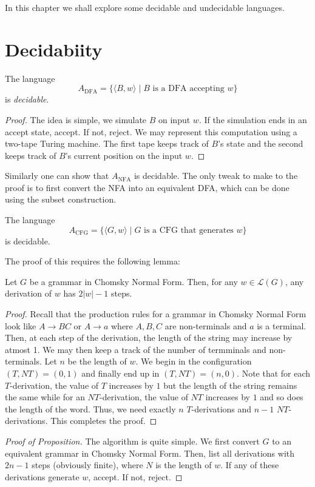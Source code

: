 In this chapter we shall explore some decidable and undecidable languages. 

\section{Decidabiity}

\begin{proposition}
    The language 
    \begin{equation*}
        A_\text{DFA} = \{\langle B, w\rangle\mid \text{$B$ is a DFA accepting $w$}\}
    \end{equation*}
    is \textit{decidable}.
\end{proposition}
\begin{proof}
    The idea is simple, we simulate $B$ on input $w$. If the simulation ends in an accept state, accept. If not, reject. We may represent this computation using a two-tape Turing machine. The first tape keeps track of $B$'s state and the second keeps track of $B$'s current position on the input $w$.
\end{proof}

Similarly one can show that $A_\text{NFA}$ is decidable. The only tweak to make to the proof is to first convert the NFA into an equivalent DFA, which can be done using the subset construction.

\begin{proposition}
    The language 
    \begin{equation*}
        A_\text{CFG} = \{\langle G, w\rangle\mid\text{$G$ is a CFG that generates $w$}\}
    \end{equation*}
    is decidable.
\end{proposition}

The proof of this requires the following lemma:
\begin{lemma}
    Let $G$ be a grammar in Chomsky Normal Form. Then, for any $w\in\mathcal{L}(G)$, any derivation of $w$ has $2|w| - 1$ steps.
\end{lemma}
\begin{proof}
    Recall that the production rules for a grammar in Chomsky Normal Form look like $A\rightarrow BC$ or $A\rightarrow a$ where $A,B,C$ are non-terminals and $a$ is a terminal. Then, at each step of the derivation, the length of the string may increase by atmost 1. We may then keep a track of the number of termminals and non-terminals. Let $n$ be the length of $w$. We begin in the configuration $(T, NT) = (0, 1)$ and finally end up in $(T, NT) = (n, 0)$. Note that for each $T$-derivation, the value of $T$ increases by $1$ but the length of the string remains the same while for an $NT$-derivation, the value of $NT$ increases by $1$ and so does the length of the word. Thus, we need exactly $n$ $T$-derivations and $n-1$ $NT$-derivations. This completes the proof.
\end{proof}
\begin{proof}[Proof of Proposition]
    The algorithm is quite simple. We first convert $G$ to an equivalent grammar in Chomsky Normal Form. Then, list all derivations with $2n - 1$ steps (obviously finite), where $N$ is the length of $w$. If any of these derivations generate $w$, accept. If not, reject.
\end{proof}

